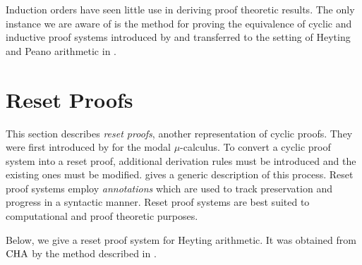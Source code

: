 Induction orders have seen little use in deriving proof theoretic
results. The only instance we are aware of is the method for proving the
equivalence of cyclic and inductive proof systems introduced by
\textcite{sprengerStructureInductiveReasoning2003} and transferred to the setting
of Heyting and Peano arithmetic in \papTwo{}.

\section{Reset Proofs}
\label{sec:reset}

This section describes \emph{reset proofs}, another representation of cyclic
proofs. They were first introduced by
\textcite{jungteerapanichTableauSystemsModal2010} for the modal $\mu$-calculus.
To convert a cyclic proof system into a reset proof, additional derivation rules
must be introduced and the existing ones must be modified. \papOne{} gives a
generic description of this process. Reset proof systems employ
\emph{annotations} which are used to track preservation and progress in a
syntactic manner. Reset proof systems are best suited to computational and proof
theoretic purposes.

Below, we give a reset proof system for Heyting arithmetic. It was obtained from
$\mathrm{CHA}$ by
the method described in \papOne{}.

